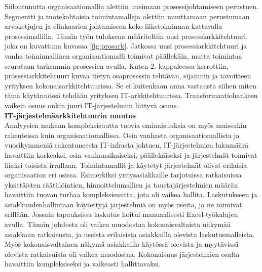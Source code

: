 \documentclass[finnish,12pt,a4paper,pdftex]{article}
\begin{document}
\noindent Siiloutunutta organisaatiomallia alettiin uusimaan prosessijohtamiseen perustuen. Segmentti ja tuotekohtaisia toimintamalleja alettiin muuttamaan perustumaan arvoketjujen ja elinkaarien johtamiseen koko liiketoiminnan kattavalla prosessimallilla. Tämän työn tuloksena määriteltiin uusi prosessiarkkitehtuuri, joka on kuvattuna kuvassa \ref{fig:prosark}. Jatkossa uusi prosessiarkkitehtuuri ja vanha toiminnallinen organisaatiomalli toimivat päällekäin, mutta toimintaa seurataan tarkemmin prosessien avulla. Kuten 2. kappaleessa kerrottiin, prosessiarkkitehtuuri kuvaa tietyn osaprosessin tehtävän, sijainnin ja tavoitteen yrityksen kokonaisarkkitehtuurissa. Se ei kuitenkaan anna vastausta siihen miten tämä käytännössä tehdään yrityksen IT-arkkitehtuurissa. Transformaatiohankeen vaikein osuus onkin juuri IT-järjestelmiin liittyvä osuus.\\

\textbf{IT-järjestelmäarkkitehtuurin muutos}\\

\noindent Analyysien mukaan kompleksisuutta tuovia ominaisuuksia on myös muissakin rakenteissa kuin organisaatiomallissa. Osin vanhasta organisaatiomallista ja vuosikymmeniä rakentuneesta IT-infrasta johtuen, IT-järjestelmien lukumäärä havaittiin korkeaksi, osin vanhanaikaiseksi, päällekäiseksi ja järjestelmät toimivat liiaksi toisista irrallaan. Toimintamallit ja käytetyt järjestelmät olivat erilaisia organisaation eri osissa. Esimerkiksi yritysasiakkaille tarjotuissa ratkaisuissa yksittäisten räätälöintien, hinnoittelumallien ja taustajärjestelmien määrän havaittiin tuovan turhaa kompleksisuutta, jota oli vaikea hallita. Laskutukseen ja asiakkuudenhallintaan käytettyjä järjestelmiä on myös useita, ja ne toimivat erillään. Jossain tapauksissa laskutus hoitui manuaalisesti Excel-työkalujen avulla. Tämän johdosta oli vaikea muodostaa kokonaisvaltaista näkymää asiakkaan ratkaisusta, ja useista erilaisista asiakkailla olevista laskutusmalleista. Myös kokonaisvaltainen näkymä asiakkailla käytössä olevista ja myytävissä olevista ratkaisuista oli vaikea muodostaa. Kokonaisuus järjestelmien osalta havaittiin kompleksiseksi ja vaikeasti hallittavaksi.\\
\end{document}
